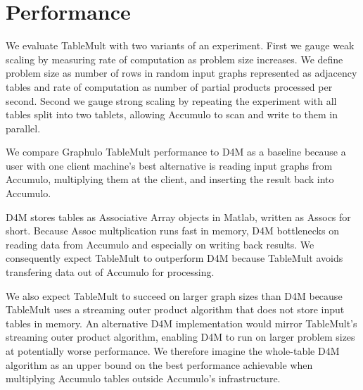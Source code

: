 
\section{Performance}
\label{sPerformance}

We evaluate TableMult with two variants of an experiment. 
First we gauge weak scaling by measuring rate of computation as problem size increases.
We define problem size as number of rows in random input graphs 
represented as adjacency tables
and rate of computation as number of partial products processed per second.
Second we gauge strong scaling by repeating the experiment with all tables split into two tablets,
allowing Accumulo to scan and write to them in parallel.



We compare Graphulo TableMult performance to D4M as a baseline because 
a user with one client machine's best alternative is reading input graphs from Accumulo, 
multiplying them at the client, and inserting the result back into Accumulo.

D4M stores tables as Associative Array objects in Matlab, written as Assocs for short.  
Because Assoc multplication runs fast in memory, 
D4M bottlenecks on reading data from Accumulo and especially on writing back results.
We consequently expect TableMult to outperform D4M 
because TableMult avoids transfering data out of Accumulo for processing. 

We also expect TableMult to succeed on larger graph sizes than D4M because TableMult
uses a streaming outer product algorithm that does not store input tables in memory.
An alternative D4M implementation would mirror TableMult's streaming outer product algorithm,
enabling D4M to run on larger problem sizes at potentially worse performance.
We therefore imagine the whole-table D4M algorithm as an upper bound on the best performance 
achievable when multiplying Accumulo tables outside Accumulo's infrastructure.

